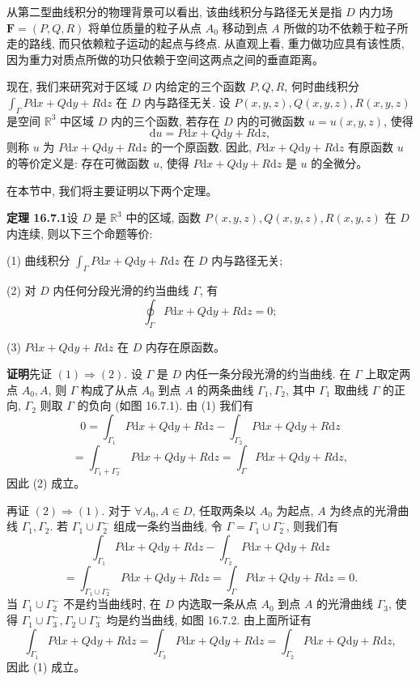 \documentclass[UTF8, 12pt, fontset=fandol, oneside]{ctexart}
\begin{document}
从第二型曲线积分的物理背景可以看出, 该曲线积分与路径无关是指 $D$ 内力场 $\boldsymbol F=(P,Q,R)$ 将单位质量的粒子从点 $A_0$ 移动到点 $A$ 所做的功不依赖于粒子所走的路线, 而只依赖粒子运动的起点与终点. 从直观上看, 重力做功应具有该性质, 因为重力对质点所做的功只依赖于空间这两点之间的垂直距离。

现在, 我们来研究对于区域 $D$ 内给定的三个函数 $P,Q,R$, 何时曲线积分 $\int_\Gamma P\mathrm dx+Q\mathrm dy+R\mathrm dz$ 在 $D$ 内与路径无关. 设 $P(x,y,z),Q(x,y,z),R(x,y,z)$ 是空间 $\mathbb R^3$ 中区域 $D$ 内的三个函数, 若存在 $D$ 内的可微函数 $u=u(x,y,z)$, 使得
\[
  \mathrm du=P\mathrm dx+Q\mathrm dy+R\mathrm dz,
\]
则称 $u$ 为 $P\mathrm dx+Q\mathrm dy+R\mathrm dz$ 的一个原函数. 因此, $P\mathrm dx+Q\mathrm dy+R\mathrm dz$ 有原函数 $u$ 的等价定义是: 存在可微函数 $u$, 使得 $P\mathrm dx+Q\mathrm dy+R\mathrm dz$ 是 $u$ 的全微分。

在本节中, 我们将主要证明以下两个定理。

\noindent\textbf{定理 16.7.1}\quad 设 $D$ 是 $\mathbb R^3$ 中的区域, 函数 $P(x,y,z),Q(x,y,z),R(x,y,z)$ 在 $D$ 内连续, 则以下三个命题等价:

(1) 曲线积分 $\int_\Gamma P\mathrm dx+Q\mathrm dy+R\mathrm dz$ 在 $D$ 内与路径无关;

(2) 对 $D$ 内任何分段光滑的约当曲线 $\Gamma$, 有
\[
  \oint_\Gamma P\mathrm dx+Q\mathrm dy+R\mathrm dz=0;
\]

(3) $P\mathrm dx+Q\mathrm dy+R\mathrm dz$ 在 $D$ 内存在原函数。

\noindent\textbf{证明}\quad 先证 $(1)\Rightarrow(2)$. 设 $\Gamma$ 是 $D$ 内任一条分段光滑的约当曲线. 在 $\Gamma$ 上取定两点 $A_0,A$, 则 $\Gamma$ 构成了从点 $A_0$ 到点 $A$ 的两条曲线 $\Gamma_1,\Gamma_2$, 其中 $\Gamma_1$ 取曲线 $\Gamma$ 的正向, $\Gamma_2$ 则取 $\Gamma$ 的负向 (如图 16.7.1). 由 (1) 我们有
\[
  0=\int_{\Gamma_1}P\mathrm dx+Q\mathrm dy+R\mathrm dz
  -\int_{\Gamma_2}P\mathrm dx+Q\mathrm dy+R\mathrm dz
\]
\[
  =\int_{\Gamma_1+\Gamma_2^-}P\mathrm dx+Q\mathrm dy+R\mathrm dz
  =\int_\Gamma P\mathrm dx+Q\mathrm dy+R\mathrm dz,
\]
因此 (2) 成立。

再证 $(2)\Rightarrow(1)$. 对于 $\forall A_0,A\in D$, 任取两条以 $A_0$ 为起点, $A$ 为终点的光滑曲线 $\Gamma_1,\Gamma_2$. 若 $\Gamma_1\cup\Gamma_2^-$ 组成一条约当曲线, 令 $\Gamma=\Gamma_1\cup\Gamma_2^-$, 则我们有
\[
  \int_{\Gamma_1}P\mathrm dx+Q\mathrm dy+R\mathrm dz
  -\int_{\Gamma_2}P\mathrm dx+Q\mathrm dy+R\mathrm dz
\]
\[
  =\int_{\Gamma_1\cup\Gamma_2^-}P\mathrm dx+Q\mathrm dy+R\mathrm dz
  =\int_\Gamma P\mathrm dx+Q\mathrm dy+R\mathrm dz=0.
\]
当 $\Gamma_1\cup\Gamma_2^-$ 不是约当曲线时, 在 $D$ 内选取一条从点 $A_0$ 到点 $A$ 的光滑曲线 $\Gamma_3$, 使得 $\Gamma_1\cup\Gamma_3^-,\Gamma_2\cup\Gamma_3^-$ 均是约当曲线, 如图 16.7.2. 由上面所证有
\[
  \int_{\Gamma_1}P\mathrm dx+Q\mathrm dy+R\mathrm dz
  =\int_{\Gamma_3}P\mathrm dx+Q\mathrm dy+R\mathrm dz
  =\int_{\Gamma_2}P\mathrm dx+Q\mathrm dy+R\mathrm dz,
\]
因此 (1) 成立。
\end{document}
